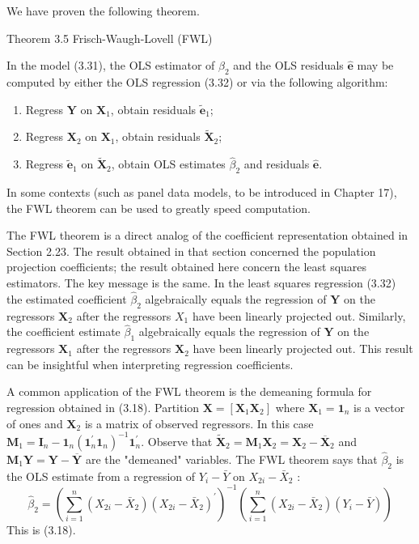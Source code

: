 \documentclass[10pt]{article}
\begin{document}
We have proven the following theorem.

Theorem 3.5 Frisch-Waugh-Lovell (FWL)

In the model (3.31), the OLS estimator of $\beta_{2}$ and the OLS residuals $\widehat{\boldsymbol{e}}$ may be computed by either the OLS regression (3.32) or via the following algorithm:

\begin{enumerate}
  \item Regress $\boldsymbol{Y}$ on $\boldsymbol{X}_{1}$, obtain residuals $\widetilde{\boldsymbol{e}}_{1}$;

  \item Regress $\boldsymbol{X}_{2}$ on $\boldsymbol{X}_{1}$, obtain residuals $\widetilde{\boldsymbol{X}}_{2}$;

  \item Regress $\widetilde{\boldsymbol{e}}_{1}$ on $\widetilde{\boldsymbol{X}}_{2}$, obtain OLS estimates $\widehat{\beta}_{2}$ and residuals $\widehat{\boldsymbol{e}}$.

\end{enumerate}
In some contexts (such as panel data models, to be introduced in Chapter 17), the FWL theorem can be used to greatly speed computation.

The FWL theorem is a direct analog of the coefficient representation obtained in Section 2.23. The result obtained in that section concerned the population projection coefficients; the result obtained here concern the least squares estimators. The key message is the same. In the least squares regression (3.32) the estimated coefficient $\widehat{\beta}_{2}$ algebraically equals the regression of $\boldsymbol{Y}$ on the regressors $\boldsymbol{X}_{2}$ after the regressors $X_{1}$ have been linearly projected out. Similarly, the coefficient estimate $\widehat{\beta}_{1}$ algebraically equals the regression of $\boldsymbol{Y}$ on the regressors $\boldsymbol{X}_{1}$ after the regressors $\boldsymbol{X}_{2}$ have been linearly projected out. This result can be insightful when interpreting regression coefficients.

A common application of the FWL theorem is the demeaning formula for regression obtained in (3.18). Partition $\boldsymbol{X}=\left[\boldsymbol{X}_{1} \boldsymbol{X}_{2}\right]$ where $\boldsymbol{X}_{1}=\mathbf{1}_{n}$ is a vector of ones and $\boldsymbol{X}_{2}$ is a matrix of observed regressors. In this case $\boldsymbol{M}_{1}=\boldsymbol{I}_{n}-\mathbf{1}_{n}\left(\mathbf{1}_{n}^{\prime} \mathbf{1}_{n}\right)^{-1} \mathbf{1}_{n}^{\prime}$. Observe that $\widetilde{\boldsymbol{X}}_{2}=\boldsymbol{M}_{1} \boldsymbol{X}_{2}=\boldsymbol{X}_{2}-\overline{\boldsymbol{X}}_{2}$ and $\boldsymbol{M}_{1} \boldsymbol{Y}=\boldsymbol{Y}-\overline{\boldsymbol{Y}}$ are the "demeaned" variables. The FWL theorem says that $\widehat{\beta}_{2}$ is the OLS estimate from a regression of $Y_{i}-\bar{Y}$ on $X_{2 i}-\bar{X}_{2}$ :
$$
\widehat{\beta}_{2}=\left(\sum_{i=1}^{n}\left(X_{2 i}-\bar{X}_{2}\right)\left(X_{2 i}-\bar{X}_{2}\right)^{\prime}\right)^{-1}\left(\sum_{i=1}^{n}\left(X_{2 i}-\bar{X}_{2}\right)\left(Y_{i}-\bar{Y}\right)\right)
$$
This is (3.18).
\end{document}
